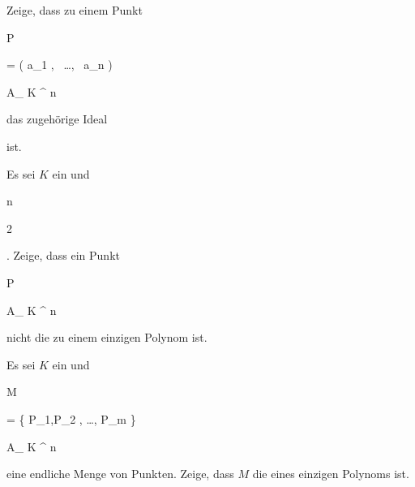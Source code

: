 {} {}




{}


{


Zeige, dass zu einem Punkt


\mavergleichskette


{\vergleichskette


{ P
}


{ = }{ \left(  a_1   , \,   \ldots  , \,   a_n          \right)
}


{ \in }{ { {\mathbb A}_{  K  }^{  n   } }
}


{    }{
}


{   }{
}


}
{}{}{}
das zugehörige Ideal


 {  }


ist.


}


{} {}




{}


{


Es sei $K$ ein
und


\mavergleichskette


{\vergleichskette


{ n
}


{ \geq }{ 2
}


{  }{
}


{    }{
}


{   }{
}


}
{}{}{.}
Zeige, dass ein Punkt


\mavergleichskette


{\vergleichskette


{ P
}


{ \in }{ { {\mathbb A}_{  K }^{  n   } }
}


{  }{
}


{    }{
}


{   }{
}


}
{}{}{}
nicht die
zu einem einzigen Polynom ist.


}


{} {}




{}


{


Es sei $K$ ein
und


\mavergleichskette


{\vergleichskette


{ M
}


{ = }{ \{ P_1,P_2 , \ldots , P_m \}
}


{ \subseteq }{ { {\mathbb A}_{  K  }^{  n   } }
}


{    }{
}


{   }{
}


}
{}{}{}
eine endliche Menge von Punkten. Zeige, dass $M$ die
eines einzigen Polynoms ist.


}



